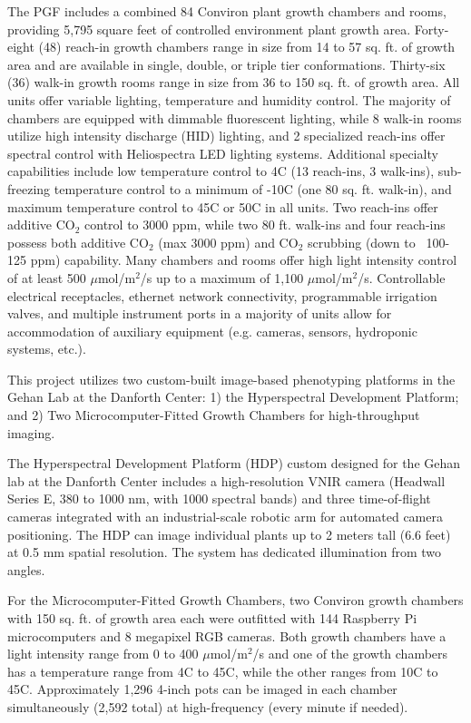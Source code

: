 \documentclass[11pt]{article}
\begin{document}
The PGF includes a combined 84 Conviron plant growth chambers and rooms,
providing 5,795 square feet of controlled environment plant growth area.
Forty-eight (48) reach-in growth chambers range in size from 14 to 57 sq. ft. of
growth area and are available in single, double, or triple tier conformations.
Thirty-six (36) walk-in growth rooms range in size from 36 to 150 sq. ft. of
growth area.  All units offer variable lighting, temperature and humidity
control. The majority of chambers are equipped with dimmable fluorescent
lighting, while 8 walk-in rooms utilize high intensity discharge (HID)
lighting, and 2 specialized reach-ins offer spectral control with Heliospectra
LED lighting systems. Additional specialty capabilities include low temperature
control to 4C (13 reach-ins, 3 walk-ins), sub-freezing temperature control to a
minimum of -10C (one 80 sq. ft. walk-in), and maximum temperature control to 45C
or 50C in all units. Two reach-ins offer additive CO$_2$ control to 3000 ppm,
while two 80 ft. walk-ins and four reach-ins possess both additive CO$_2$ (max 3000
ppm) and CO$_2$ scrubbing (down to ~100-125 ppm) capability. Many chambers and
rooms offer high light intensity control of at least 500 $\mu$mol/m$^2$/s up to a
maximum of 1,100 $\mu$mol/m$^2$/s.  Controllable electrical receptacles, ethernet
network connectivity, programmable irrigation valves, and multiple instrument
ports in a majority of units allow for accommodation of auxiliary equipment
(e.g. cameras, sensors, hydroponic systems, etc.).

This project utilizes two custom-built image-based phenotyping platforms in the
Gehan Lab at the Danforth Center: 1) the Hyperspectral Development Platform;
and 2) Two Microcomputer-Fitted Growth Chambers for high-throughput imaging.

The Hyperspectral Development Platform (HDP) custom designed for the Gehan lab
at the Danforth Center includes a high-resolution VNIR camera (Headwall Series
E, 380 to 1000 nm, with 1000 spectral bands) and three time-of-flight cameras
integrated with an industrial-scale robotic arm for automated camera
positioning. The HDP can image individual plants up to 2 meters tall (6.6 feet)
at 0.5 mm spatial resolution. The system has dedicated illumination from two
angles.

For the Microcomputer-Fitted Growth Chambers, two Conviron growth chambers with
150 sq. ft. of growth area each were outfitted with 144 Raspberry Pi
microcomputers and 8 megapixel RGB cameras. Both growth chambers have a light
intensity range from 0 to 400 $\mu$mol/m$^2$/s and one of the growth chambers has a
temperature range from 4C to 45C, while the other ranges from 10C to 45C.
Approximately 1,296 4-inch pots can be imaged in each chamber simultaneously
(2,592 total) at high-frequency (every minute if needed).
\end{document}
